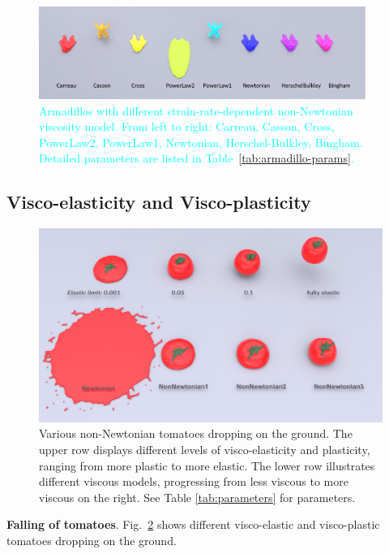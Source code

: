 \documentclass[10pt,journal,compsoc]{IEEEtran}
\newcommand{\revised}[1]{{\textcolor{cyan}{#1}}}
\begin{document}
\begin{figure}[htbp]
	\centering
	\includegraphics[width=0.95\textwidth]{pics/ramp.png}
	\caption{\revised{Armadillos with different strain-rate-dependent non-Newtonian viscosity model. From left to right: Carreau, Casson, Cross, PowerLaw2, PowerLaw1, Newtonian, Herschel-Bulkley, Bingham. Detailed parameters are listed in Table~\ref{tab:armadillo-params}.}}     \label{fig:ramp}
\end{figure}


\subsection{Visco-elasticity and Visco-plasticity}\label{sec.}



\begin{figure}[htbp]
	\centering
	\includegraphics[width=.95\linewidth]{pics/teaser.png}
	\caption{Various non-Newtonian tomatoes dropping on the ground. The upper row displays different levels of visco-elasticity and plasticity, ranging from more plastic to more elastic. The lower row illustrates different viscous models, progressing from less viscous to more viscous on the right. See Table \ref{tab:parameters} for parameters. }\label{fig:teaser}
\end{figure}



\textbf{Falling of tomatoes}.
Fig.~\ref{fig:teaser} shows different visco-elastic and visco-plastic tomatoes dropping on the ground.
\end{document}
